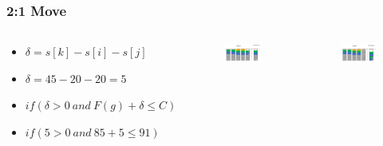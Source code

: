 \documentclass{beamer}
\begin{document}
\begin{frame}
\frametitle{2:1 Move}
\begin{columns}[c] %
\begin{footnotesize}
\begin{itemize}
\item $\delta = s[k]-s[i]-s[j]$
\item $\delta = 45 - 20 - 20 = 5$
\item $if(\delta > 0 \ and \ F(g)+\delta \leq C)$
\item $if(5 > 0 \ and \ 85+5 \leq 91)$
\end{itemize}
\end{footnotesize}
\begin{figure}[!htbp]
\begin{center}
\includegraphics[scale=0.22]{img/2 zu 1 Move.png}
\end{center}
\label{fig:architecture}
\end{figure}
\begin{figure}[!htbp]
\begin{center}
\includegraphics[scale=0.22]{img/2 zu 1 Move fertig.png}
\end{center}
\label{fig:architecture}
\end{figure}
\end{columns}
\end{frame}
\end{document}

